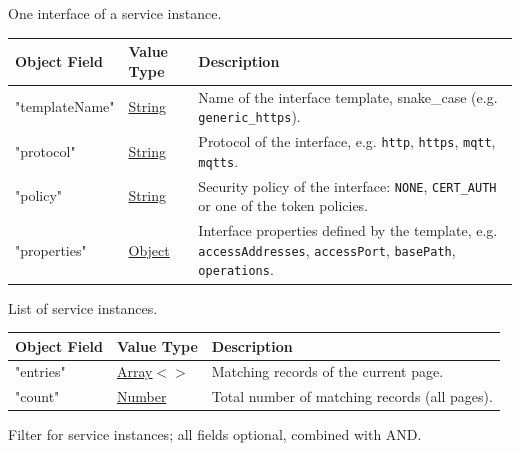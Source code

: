 \documentclass[a4paper]{arrowhead}
\newcommand{\mref}[2][]{{\textcolor{ArrowheadPurple}{\hyperref[sec:model:#2]{\ifstrempty{#1}{#2}{#1}}}}}
\newcommand{\pref}[1]{{\textcolor{ArrowheadGrey}{\hyperref[sec:model:primitives:#1]{#1}}}}
\begin{document}

One interface of a service instance.


\noindent\begin{tabularx}{\textwidth}{| >{\raggedright\arraybackslash}p{3.9cm} | >{\raggedright\arraybackslash\small}p{5.3cm} | X |} \hline
\rowcolor{gray!33} Object Field & Value Type & Description \\ \hline
"template\allowbreak{}Name" & \pref{String} & Name of the interface template, snake\_case (e.g. \texttt{generic\_\allowbreak{}https}). \\ \hline
"protocol" & \pref{String} & Protocol of the interface, e.g. \texttt{http}, \texttt{https}, \texttt{mqtt}, \texttt{mqtts}. \\ \hline
"policy" & \pref{String} & Security policy of the interface: \texttt{NONE}, \texttt{CERT\_\allowbreak{}AUTH} or one of the token policies. \\ \hline
"properties" & \pref{Object} & Interface properties defined by the template, e.g. \texttt{accessAddresses}, \texttt{accessPort}, \texttt{basePath}, \texttt{operations}. \\ \hline
\end{tabularx}




List of service instances.


\noindent\begin{tabularx}{\textwidth}{| >{\raggedright\arraybackslash}p{3.9cm} | >{\raggedright\arraybackslash\small}p{5.3cm} | X |} \hline
\rowcolor{gray!33} Object Field & Value Type & Description \\ \hline
"entries" & \pref{Array}$<$\allowbreak{}\mref{ServiceInstanceResponse}$>$ & Matching records of the current page. \\ \hline
"count" & \pref{Number} & Total number of matching records (all pages). \\ \hline
\end{tabularx}




Filter for service instances; all fields optional, combined with AND.
\end{document}
